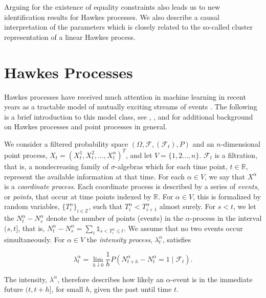 \documentclass[accepted]{uai2021} %
\begin{document}
Arguing for the existence of equality constraints also leads us to new 
identification 
results for Hawkes processes. We also describe a causal interpretation of the 
parameters which is closely 
related to the so-called cluster representation of a linear Hawkes process.




\section{Hawkes Processes}
\label{sec:hawPro}

Hawkes processes have received much attention in machine learning in recent 
years as a tractable model of mutually exciting streams of events 
\citep{zhou2013b,luo2015,etesami2016,tan2018,xu2018,trouleau2019}. 
The following is a brief introduction to this model class,
see \cite{laubHawkes2015}, \cite{linigerThesis}, and \cite{daleyVere} for 
additional background on Hawkes processes and point processes in general.

We consider a filtered probability space $(\Omega, \mathcal{F}, 
(\mathcal{F}_t), P)$ and an $n$-dimensional point process, $X_t = 
(X_t^1,X_t^2,\ldots,X_t^n)^T$, and let $V= \{1,2\ldots, n\}$. $\mathcal{F}_t$ 
is 
a filtration, that is, a nondecreasing family of $\sigma$-algebras which for 
each time point, $t\in \mathbb{R}$, represent the available information at 
that time. For each 
$\alpha\in 
V$, we say that $X^\alpha$ is a \emph{coordinate process}. Each coordinate 
process is described by a series of \emph{events}, or \emph{points}, that occur 
at time points indexed by $\mathbb{R}$. For $\alpha \in V$, this is formalized 
by random variables, $\{T_i^\alpha\}_{i\in\mathbb{Z}}$, such 
that $T_i^\alpha < T_{i+1}^\alpha$ almost surely. For $s<t$, we let the  
$N_t^\alpha - 
N_s^\alpha$ denote the number of points (events) in the $\alpha$-process 
in the interval $(s,t]$, that is,  $N_t^\alpha - 
N_s^\alpha= \sum_i \mathds{1}_{s < T_i^\alpha \leq t}$. We 
assume that no 
two events occur simultaneously. For 
$\alpha\in V$ the \emph{intensity process}, $\lambda_t^\alpha$, 
satisfies

$$
\lambda_t^{\alpha} = \lim_{h \downarrow 0} \dfrac{1}{h} P(N_{t + h}^\alpha  - 
N_t^\alpha = 1
\mid \mathcal{F}_t).
$$

The intensity, $\lambda^\alpha$, therefore describes how likely an 
$\alpha$-event is in the immediate future $(t, t+h]$, for small $h$, given the 
past until time $t$.
\end{document}
